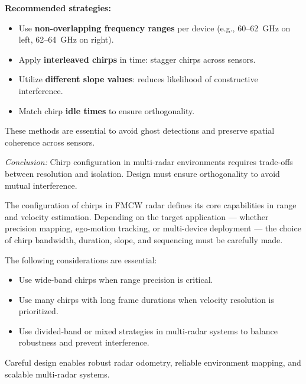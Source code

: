 \textbf{Recommended strategies:}
\begin{itemize}
    \item Use \textbf{non-overlapping frequency ranges} per device (e.g., 60–62~GHz on left, 62–64~GHz on right).
    \item Apply \textbf{interleaved chirps} in time: stagger chirps across sensors.
    \item Utilize \textbf{different slope values}: reduces likelihood of constructive interference.
    \item Match chirp \textbf{idle times} to ensure orthogonality.
\end{itemize}

These methods are essential to avoid ghost detections and preserve spatial coherence across sensors.

\vspace{1em}

{\small
\textit{Conclusion:} Chirp configuration in multi-radar environments requires trade-offs between resolution and isolation.  
Design must ensure orthogonality to avoid mutual interference.
}

\vspace{1em}

The configuration of chirps in FMCW radar defines its core capabilities in range and velocity estimation.
Depending on the target application — whether precision mapping, ego-motion tracking, or multi-device deployment — the choice of chirp bandwidth, duration, slope, and sequencing must be carefully made.

The following considerations are essential:
\begin{itemize}
    \item Use wide-band chirps when range precision is critical.
    \item Use many chirps with long frame durations when velocity resolution is prioritized.
    \item Use divided-band or mixed strategies in multi-radar systems to balance robustness and prevent interference.
\end{itemize}

Careful design enables robust radar odometry, reliable environment mapping, and scalable multi-radar systems.
